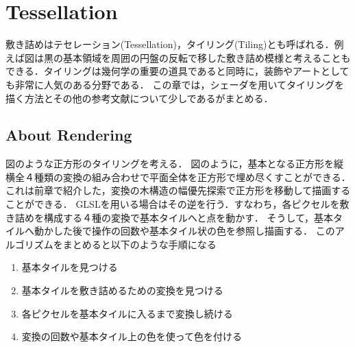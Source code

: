 
\section{Tessellation}

敷き詰めはテセレーション(Tessellation)，タイリング(Tiling)とも呼ばれる．例えば図は黒の基本領域を周囲の円盤の反転で移した敷き詰め模様と考えることもできる．タイリングは幾何学の重要の道具であると同時に，装飾やアートとしても非常に人気のある分野である．
この章では，シェーダを用いてタイリングを描く方法とその他の参考文献について少しであるがまとめる．

\subsection{About Rendering}

図のような正方形のタイリングを考える．
図のように，基本となる正方形を縦横全４種類の変換の組み合わせで平面全体を正方形で埋め尽くすことができる．これは前章で紹介した，変換の木構造の幅優先探索で正方形を移動して描画することができる．
GLSLを用いる場合はその逆を行う．すなわち，各ピクセルを敷き詰めを構成する４種の変換で基本タイルへと点を動かす．
そうして，基本タイルへ動かした後で操作の回数や基本タイル状の色を参照し描画する．
このアルゴリズムをまとめると以下のような手順になる
\begin{enumerate}
 \item 基本タイルを見つける
 \item 基本タイルを敷き詰めるための変換を見つける
 \item 各ピクセルを基本タイルに入るまで変換し続ける
 \item 変換の回数や基本タイル上の色を使って色を付ける
\end{enumerate}

